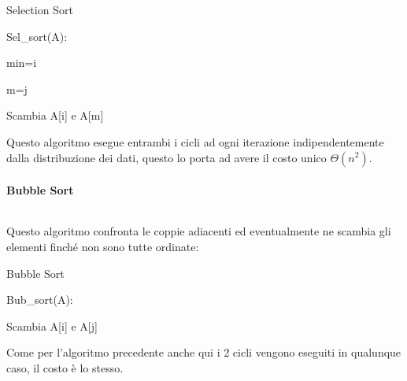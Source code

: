 \documentclass{article}
\begin{document}
\begin{algorithm}[ht]
\caption{Selection Sort}
\begin{algorithmic}
\State Sel\_sort(A):


        \State min=i 



                \State m=j

            \EndIf

        \EndFor

        \State Scambia A[i] e A[m]
    
    \EndFor

\end{algorithmic}
\end{algorithm}

\noindent Questo algoritmo esegue entrambi i cicli ad ogni iterazione indipendentemente dalla distribuzione dei dati, questo lo porta ad avere il costo unico $\Theta(n^2)$.\newline

\paragraph{Bubble Sort} $\ $\newline

\noindent Questo algoritmo confronta le coppie adiacenti ed eventualmente ne scambia gli elementi finché non sono tutte ordinate:

\begin{algorithm}[ht]
\caption{Bubble Sort}
\begin{algorithmic}
\State Bub\_sort(A):



                \State Scambia A[i] e A[j]

            \EndIf

        \EndFor
    
    \EndFor

\end{algorithmic}
\end{algorithm}

\noindent Come per l'algoritmo precedente anche qui i 2 cicli vengono eseguiti in qualunque caso, il costo è lo stesso.\newline
\end{document}
